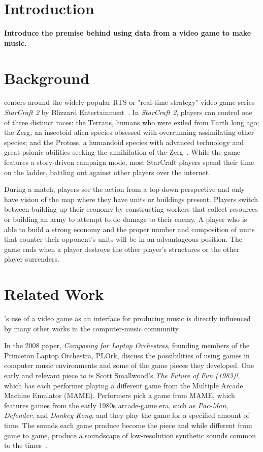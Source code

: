 \documentclass{nime-document-class}
\begin{document}
\section{Introduction}
{\bf Introduce the premise behind using data from a video game to make music.}

\section{Background}
\projectName{} centers around the widely popular RTS or "real-time strategy" video game series {\em StarCraft 2} by Blizzard Entertainment~\cite{Blizzard:2013:Online}.
In {\em StarCraft 2}, players can control one of three distinct races: the Terrans, humans who were exiled from Earth long ago; the Zerg, an insectoid alien species obsessed with overrunning assimilating other species; and the Protoss, a humandoid species with advanced technology and great psionic abilities seeking the annihilation of the Zerg~\cite{BlizzardRaces:2013:Online}.
While the game features a story-driven campaign mode, most StarCraft players spend their time on the ladder, battling out against other players over the internet. 

During a match, players see the action from a top-down perspective and only have vision of the map where they have units or buildings present.
Players switch between building up their economy by constructing workers that collect resources or building an army to attempt to do damage to their enemy.
A player who is able to build a strong economy and the proper number and composition of units that counter their opponent's units will be in an advantageous position.
The game ends when a player destroys the other player's structures or the other player surrenders.

\section{Related Work}
\projectName{}'s use of a video game as an interface for producing music is directly influenced by many other works in the computer-music community.

In the 2008 paper, {\em Composing for Laptop Orchestras}, founding members of the Princeton Laptop Orchestra, PLOrk, discuss the possibilities of using games in computer music environments and some of the game pieces they developed.
One early and relevant piece to \projectName{} is Scott Smallwood's {\em The Future of Fun (1983)!}, which has each performer playing a different game from the Multiple Arcade Machine Emulator (MAME).
Performers pick a game from MAME, which features games from the early 1980s arcade-game era, such as {\em Pac-Man}, {\em Defender}, and {\em Donkey Kong}, and they play the game for a specified amount of time.
The sounds each game produce become the piece and while different from game to game, produce a soundscape of low-resolution synthetic sounds common to the times~\cite{ComposingForLaptopOrchestra:Article}.
\end{document}
